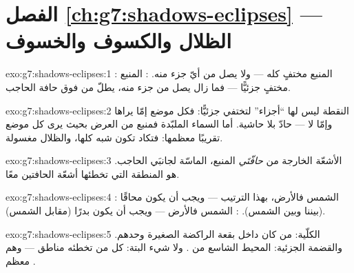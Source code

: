 \section*{الفصل \ref{ch:g7:shadows-eclipses} --- الظلال والكسوف والخسوف}

\begin{solution}{exo:g7:shadows-eclipses:1}
: المنبع مختفٍ كله --- ولا يصل  من أيّ جزء منه.
: المنبع مختفٍ جزئيًّا --- فما زال يصل  من جزء
منه، يطلّ من فوق حافة الحاجب.
\end{solution}

\begin{solution}{exo:g7:shadows-eclipses:2}
النقطة ليس لها ``أجزاء'' لتختفي جزئيًّا: فكل موضع إمّا يراها
وإمّا لا ---  حادّ بلا حاشية. أما السماء الملبّدة فمنبع من
العرض بحيث يرى كل موضع تقريبًا معظمها: فتكاد تكون شبه  كلها،
والظلال مغسولة.
\end{solution}

\begin{solution}{exo:g7:shadows-eclipses:3}
الأشعّة الخارجة من \emph{حافّتَي} المنبع، الماسّة لجانبَي
الحاجب.  هو المنطقة التي تخطئها أشعّة الحافتين
معًا.
\end{solution}

\begin{solution}{exo:g7:shadows-eclipses:4}
: الشمس  فالأرض، بهذا الترتيب --- ويجب أن يكون
 محاقًا (بيننا وبين الشمس). : الشمس فالأرض 
--- ويجب أن يكون  بدرًا (مقابل الشمس).
\end{solution}

\begin{solution}{exo:g7:shadows-eclipses:5}
الكلّية: من كان داخل بقعة  الراكضة الصغيرة وحدهم.
والقضمة الجزئية: المحيط الشاسع من . ولا شيء البتة:
كل من تخطئه مناطق  --- وهم معظم .
\end{solution}

